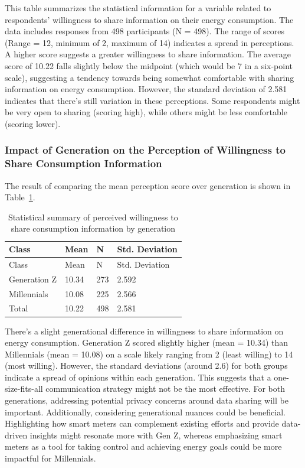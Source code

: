 \documentclass[
  letterpaper,
  DIV=11,
  numbers=noendperiod]{scrartcl}
\begin{document}
This table summarizes the statistical information for a variable related
to respondents' willingness to share information on their energy
consumption. The data includes responses from 498 participants (N =
498). The range of scores (Range = 12, minimum of 2, maximum of 14)
indicates a spread in perceptions. A higher score suggests a greater
willingness to share information. The average score of 10.22 falls
slightly below the midpoint (which would be 7 in a six-point scale),
suggesting a tendency towards being somewhat comfortable with sharing
information on energy consumption. However, the standard deviation of
2.581 indicates that there's still variation in these perceptions. Some
respondents might be very open to sharing (scoring high), while others
might be less comfortable (scoring lower).

\subsubsection{Impact of Generation on the Perception of Willingness to
Share Consumption
Information}\label{impact-of-generation-on-the-perception-of-willingness-to-share-consumption-information}

The result of comparing the mean perception score over generation is
shown in Table~\ref{tbl-sharing-info-generation}.

\begin{longtable}[]{@{}llll@{}}
\caption{Statistical summary of perceived willingness to share
consumption information by
generation}\label{tbl-sharing-info-generation}\tabularnewline
\toprule\noalign{}
Class & Mean & N & Std. Deviation \\
\midrule\noalign{}
\endfirsthead
\toprule\noalign{}
Class & Mean & N & Std. Deviation \\
\midrule\noalign{}
\endhead
\bottomrule\noalign{}
\endlastfoot
Generation Z & 10.34 & 273 & 2.592 \\
Millennials & 10.08 & 225 & 2.566 \\
Total & 10.22 & 498 & 2.581 \\
\end{longtable}

There's a slight generational difference in willingness to share
information on energy consumption. Generation Z scored slightly higher
(mean = 10.34) than Millennials (mean = 10.08) on a scale likely ranging
from 2 (least willing) to 14 (most willing). However, the standard
deviations (around 2.6) for both groups indicate a spread of opinions
within each generation. This suggests that a one-size-fits-all
communication strategy might not be the most effective. For both
generations, addressing potential privacy concerns around data sharing
will be important. Additionally, considering generational nuances could
be beneficial. Highlighting how smart meters can complement existing
efforts and provide data-driven insights might resonate more with Gen Z,
whereas emphasizing smart meters as a tool for taking control and
achieving energy goals could be more impactful for Millennials.
\end{document}
